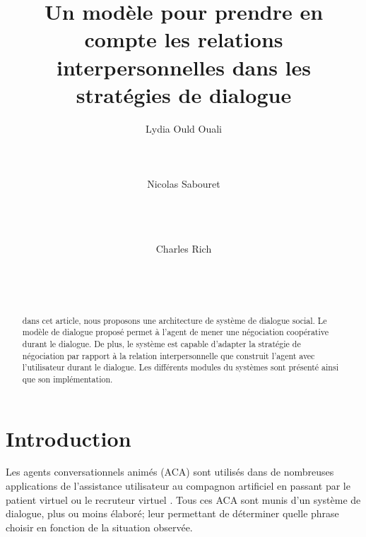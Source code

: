 \documentclass [french]{sig-alternate-05-2015}
\begin{document}
\title{Un modèle pour prendre en compte les relations interpersonnelles dans les stratégies de dialogue}



\author{
\alignauthor Lydia Ould Ouali\\
       \\
       \\
       \\
\alignauthor Nicolas Sabouret\\
       \\
       \\
       \\
        \and
\alignauthor Charles Rich\\
       \\
       \\
       \\
}


\maketitle
\begin{abstract}
\par dans cet article, nous proposons une architecture de système de dialogue social. Le modèle de dialogue proposé permet à l'agent de mener une négociation coopérative durant le dialogue. De plus, le système est capable d'adapter la stratégie de négociation par rapport à la relation interpersonnelle que construit l'agent avec l'utilisateur durant le dialogue. Les différents modules du systèmes sont présenté ainsi que son implémentation.  
\end{abstract}



\section{Introduction}


Les agents conversationnels animés (ACA) sont utilisés dans de nombreuses applications de l'assistance utilisateur \cite{sidner2013always} au compagnon artificiel \cite{sidner2013always, riviere2014aca} en passant par le patient virtuel \cite{annesysteme} ou le recruteur virtuel \cite{jones2012affective}. Tous ces ACA sont munis d'un système de dialogue, plus ou moins élaboré; leur permettant de déterminer quelle phrase choisir en fonction de la situation observée.
\end{document}
